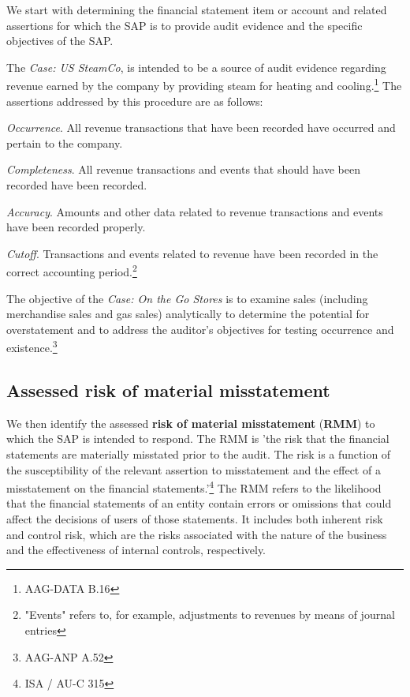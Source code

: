 We start with determining the financial statement item or account and related assertions for which the SAP is to provide audit evidence and the specific objectives of the SAP. 

The \textit{Case: US SteamCo}, is intended to be a source of audit evidence regarding revenue earned by the company by providing steam for heating and cooling.\footnote{AAG-DATA B.16} The assertions addressed by this procedure are as follows:   
\begin{compactitem}
\item \textit{Occurrence}. All revenue transactions that have been recorded have occurred and pertain to the company.
\item \textit{Completeness}. All revenue transactions and events that should have been recorded have been recorded.
\item \textit{Accuracy}. Amounts and other data related to revenue transactions and events have been recorded properly.
\item \textit{Cutoff}. Transactions and events related to revenue have been recorded in the correct accounting period.\footnote{"Events" refers to, for example, adjustments to revenues by means of journal entries}
\end{compactitem}

The objective of the \textit{Case: On the Go Stores} is to examine sales (including merchandise sales and gas sales) analytically to determine the potential for overstatement and to address the auditor's objectives for testing occurrence and existence.\footnote{AAG-ANP A.52}



\subsection{Assessed risk of material misstatement} %
\label{sub:assessed_risk_of_material_misstatement}

We then identify the assessed \textbf{risk of material misstatement} (\textbf{RMM}) to which the SAP is intended to respond. 
The RMM is 'the risk that the financial statements are materially misstated prior to the audit. The risk is a function of the susceptibility of the relevant assertion to misstatement and the effect of a misstatement on the financial statements.'\footnote{ISA / AU-C 315} The RMM refers to the likelihood that the financial statements of an entity contain errors or omissions that could affect the decisions of users of those statements. It includes both inherent risk and control risk, which are the risks associated with the nature of the business and the effectiveness of internal controls, respectively.

